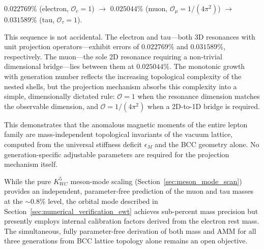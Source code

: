 \documentclass[10pt,a4paper]{article}
\begin{document}
\begin{center}
	$0.022769\%$ (electron, $\mathcal{O}_e = 1$) $\to$ 
	$0.025044\%$ (muon, $\mathcal{O}_\mu = 1/(4\pi^2)$) $\to$ 
	$0.031589\%$ (tau, $\mathcal{O}_\tau = 1$).
\end{center}

This sequence is not accidental. The electron and tau---both 3D resonances 
with unit projection operators---exhibit errors of $0.022769\%$ and $0.031589\%$, 
respectively. The muon---the sole 2D resonance requiring a non-trivial 
dimensional bridge---lies between them at $0.025044\%$. The monotonic growth 
with generation number reflects the increasing topological complexity of the 
nested shells, but the projection mechanism absorbs this complexity into a 
simple, dimensionally dictated rule: $\mathcal{O} = 1$ when the resonance 
dimension matches the observable dimension, and $\mathcal{O} = 1/(4\pi^2)$ 
when a 2D-to-1D bridge is required.

This demonstrates that the anomalous magnetic moments of the entire lepton 
family are mass-independent topological invariants of the vacuum lattice, 
computed from the universal stiffness deficit $\epsilon_M$ and the BCC 
geometry alone. No generation-specific adjustable parameters are required 
for the projection mechanism itself.

While the pure $K_{WC}^5$ meson-mode scaling (Section~\ref{sec:meson_mode_scan}) 
provides an independent, parameter-free prediction of the muon and tau masses 
at the $\sim 0.8\%$ level, the orbital mode described in 
Section~\ref{sec:numerical_verification_ewt} achieves sub-percent mass precision 
but presently employs internal calibration factors derived from the electron 
rest mass. The simultaneous, fully parameter-free derivation of both mass and 
AMM for all three generations from BCC lattice topology alone remains an open 
objective.
\end{document}
